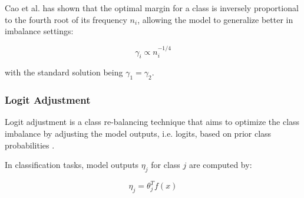 





Cao et al. \cite{cao2019learningimbalanceddatasetslabeldistributionaware} has shown that the optimal margin for a class is inversely proportional to the fourth root of its frequency $n_i$, allowing the model to generalize better in imbalance settings:

\begin{equation}
    \label{eq:opt_margin}
    \gamma_i\varpropto n^{-1/4}_i 
\end{equation}

\noindent with the standard solution being $\gamma_1=\gamma_2$. 

\subsubsection{Logit Adjustment}
\label{sec:logit_adjustment}
Logit adjustment is a class re-balancing technique that aims to optimize the class imbalance by adjusting the model outputs, i.e. logits, based on prior class probabilities \cite{menon2021longtaillearninglogitadjustment,ren2020balancedmetasoftmaxlongtailedvisual}.

In classification tasks, model outputs $\eta_j$ for class $j$ are computed by:

\begin{equation}
    \label{eq:logits}
    \eta_j = \theta^T_j f(x)
\end{equation}

